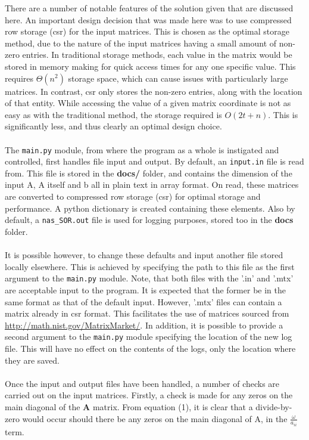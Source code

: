 \documentclass[paper=a4, fontsize=10pt]{scrartcl} %
\begin{document}
{There are a number of notable features of the solution given that are discussed here. 
An important design decision that was made here was to use compressed row storage (csr) for the input matrices. This is chosen as the optimal storage method, due to the nature of the input matrices having a small amount of non-zero entries. In traditional storage methods, each value in the matrix would be stored in memory making for quick access times for any one specific value. This requires $\Theta(n^2)$ storage space, which can cause issues with particularly large matrices. In contrast, csr only stores the non-zero entries, along with the location of that entity. While accessing the value of a given matrix coordinate is not as easy as with the traditional method, the storage required is $O(2t + n)$. This is significantly less, and thus clearly an optimal design choice.       \\\\
The \texttt{main.py} module, from where the program as a whole is instigated and controlled, first handles file input and output. By default, an \texttt{input.in} file is read from. This file is stored in the {\bf docs/} folder, and contains the dimension of the input A, A itself and b all in plain text in array format. On read, these matrices are converted to compressed row storage (csr) for optimal storage and performance. A python dictionary is created containing these elements. Also by default, a \texttt{nas\_SOR.out} file is used for logging purposes, stored too in the {\bf docs} folder. \\\\
It is possible however, to change these defaults and input another file stored locally elsewhere. This is achieved by specifying the path to this file as the first argument to the \texttt{main.py} module. Note, that both files with the '.in' and '.mtx' are acceptable input to the program. It is expected that the former be in the same format as that of the default input. However, '.mtx' files can contain a matrix already in csr format. This facilitates the use of matrices sourced from \url{http://math.nist.gov/MatrixMarket/}. In addition, it is possible to provide a second argument to the \texttt{main.py} module specifying the location of the new log file. This will have no effect on the contents of the logs, only the location where they are saved. \\\\
Once the input and output files have been handled, a number of checks are carried out on the input matrices. Firstly, a check is made for any zeros on the main diagonal of the {\bf A} matrix. From equation (1), it is clear that a divide-by-zero would occur should there be any zeros on the main diagonal of A, in the $\frac{\omega}{a_{ii}}$ term. \\\\
}
\end{document}
